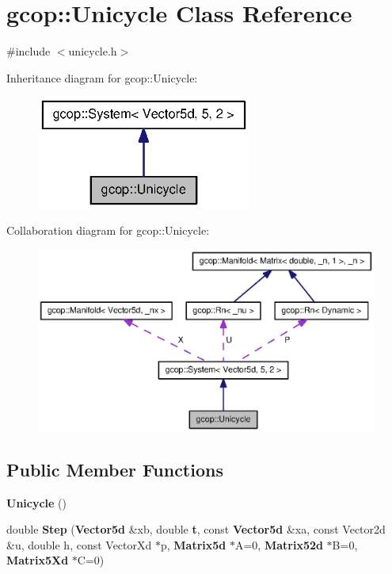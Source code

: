 \section{gcop\-:\-:\-Unicycle \-Class \-Reference}
\label{classgcop_1_1Unicycle}


{\ttfamily \#include $<$unicycle.\-h$>$}



\-Inheritance diagram for gcop\-:\-:\-Unicycle\-:\nopagebreak
\begin{figure}[H]
\begin{center}
\leavevmode
\includegraphics[width=200pt]{classgcop_1_1Unicycle__inherit__graph}
\end{center}
\end{figure}


\-Collaboration diagram for gcop\-:\-:\-Unicycle\-:\nopagebreak
\begin{figure}[H]
\begin{center}
\leavevmode
\includegraphics[width=350pt]{classgcop_1_1Unicycle__coll__graph}
\end{center}
\end{figure}
\subsection*{\-Public \-Member \-Functions}
\begin{DoxyCompactItemize}
\item 
{\bf \-Unicycle} ()
\item 
double {\bf \-Step} ({\bf \-Vector5d} \&xb, double {\bf t}, const {\bf \-Vector5d} \&xa, const \-Vector2d \&u, double h, const \-Vector\-Xd $\ast$p, {\bf \-Matrix5d} $\ast$\-A=0, {\bf \-Matrix52d} $\ast$\-B=0, {\bf \-Matrix5\-Xd} $\ast$\-C=0)
\end{DoxyCompactItemize}
